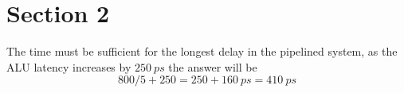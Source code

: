 \section{Section 2}
The time must be sufficient for the longest delay in the pipelined system, as the ALU latency increases by $250 \ ps$
the answer will be 
$$
800/5  + 250 = 250 + 160 \ ps = 410 \ ps
$$